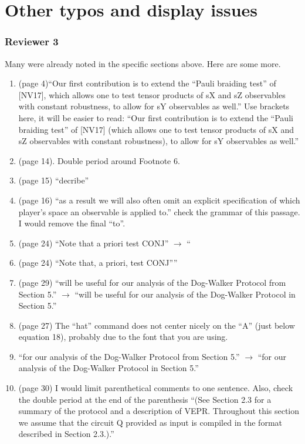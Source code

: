 \documentclass[12pt]{article}
\begin{document}
\section*{Other typos and display issues}
\subsubsection*{Reviewer 3  }
Many were already noted in the specific sections above. Here are some more.
\begin{enumerate}
\item (page 4)``Our first contribution is to extend the “Pauli braiding test” of [NV17], which allows one to test tensor
products of sX and sZ observables with constant robustness, to allow for sY observables as well.'' Use brackets here, it will be easier to read:
``Our first contribution is to extend the “Pauli braiding test” of [NV17] (which allows one to test tensor
products of sX and sZ observables with constant robustness), to allow for sY observables as well.''
\item (page 14). Double period around Footnote 6.
\item (page 15) ``decribe''
\item (page 16) ``as a result we will also often omit an
explicit specification of which player’s space an observable is applied to.'' check the grammar of this passage. I would remove the final ``to''.
   \item (page 24) ``Note that
a priori test CONJ'' $\rightarrow$ ``   \item (page 24) ``Note that,
a priori, test CONJ''''
\item (page 29) ``will be useful for our analysis of the Dog-Walker Protocol from Section 5.'' $\rightarrow$ ``will be useful for our analysis of the Dog-Walker Protocol in Section 5.''
\item (page 27) The ``hat'' command does not center nicely on the ``A'' (just below equation 18), probably due to the font that you are using.
\item ``for our analysis of the Dog-Walker Protocol from Section 5.'' $\rightarrow$ ``for our analysis of the Dog-Walker Protocol in Section 5.''
\item (page 30) I would limit parenthetical comments to one sentence. Also, check the double period at the end of the parenthesis ``(See Section 2.3 for a summary of the protocol and a description of VEPR. Throughout this section we
assume that the circuit Q provided as input is compiled in the format described in Section 2.3.).''

\end{enumerate}
\end{document}

